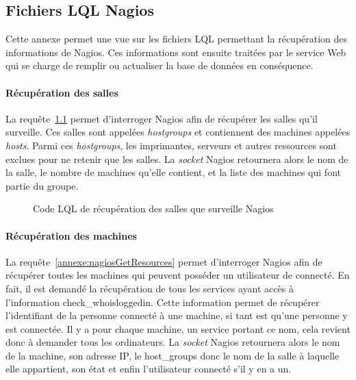 \begin{appendices}

\chapter{Fichiers LQL Nagios}
\label{chapterAnnexe:fichiersLQLNagios}

Cette annexe permet une vue sur les fichiers LQL permettant la r\'ecup\'eration des informations de Nagios. 
Ces informations sont ensuite trait\'ees par le service Web qui se charge de remplir ou actualiser la base de donn\'ees en cons\'equence.

\subsubsection{R\'ecup\'eration des salles}

La requ\^ete~\ref{annexe:nagiosGetHostGroups} permet d'interroger Nagios afin de r\'ecup\'erer les salles qu'il surveille.
Ces salles sont appel\'ees \textit{hostgroups} et contiennent des machines appel\'ees \textit{hosts}.
Parmi ces \textit{hostgroups}, les imprimantes, serveurs et autres ressources sont exclues pour ne retenir que les salles.
La \textit{socket} Nagios retournera alors le nom de la salle, le nombre de machines qu'elle contient, et la liste des machines qui font partie du groupe.

\vspace{0.20cm}

\begin{figure}[!ht]
	
	\caption{Code LQL de r\'ecup\'eration des salles que surveille Nagios}
	\label{annexe:nagiosGetHostGroups}

\end{figure}

\subsubsection{R\'ecup\'eration des machines}

La requ\^ete~\ref{annexe:nagiosGetResources} permet d'interroger Nagios afin de r\'ecup\'erer toutes les machines qui peuvent poss\'eder un utilisateur de connect\'e.
En fait, il est demand\'e la r\'ecup\'eration de tous les services ayant acc\`es \`a l'information \textsf{check\_whoisloggedin}.
Cette information permet de r\'ecup\'erer l'identifiant de la personne connect\'e \`a une machine, si tant est qu'une personne y est connect\'ee.
Il y a pour chaque machine, un service portant ce nom, cela revient donc \`a demander tous les ordinateurs.
La \textit{socket} Nagios retournera alors le nom de la machine, son adresse IP, le \textsf{host\_groups} donc le nom de la salle \`a laquelle elle appartient, son \'etat et enfin l'utilisateur connect\'e s'il y en a un.


\end{appendices}
